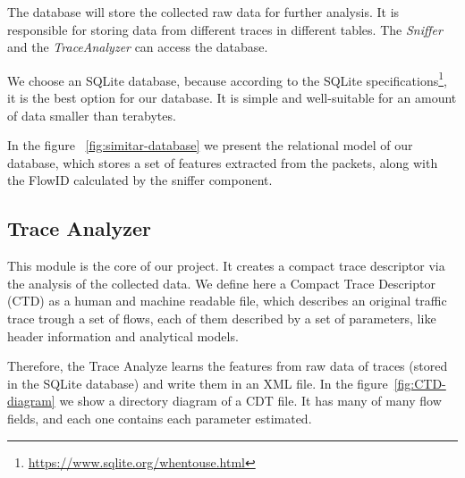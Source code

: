 The database will store the collected raw data for further analysis. It is responsible for storing data from different traces in different tables.  The \textit{Sniffer} and the \textit{TraceAnalyzer}  can access the database. 

We choose an SQLite database, because according to the SQLite specifications\footnote{\href{https://www.sqlite.org/whentouse.html}{https://www.sqlite.org/whentouse.html}}, it is the best option for our database. It is simple and well-suitable for an amount of data smaller than terabytes.

In the figure ~\ref{fig:simitar-database} we present the relational model of our database, which stores a set of features extracted from the packets, along with the FlowID calculated by the sniffer component. 


\subsection{Trace Analyzer}

This module is the core of our project. It creates a compact trace descriptor via the analysis of the collected data. We define here a Compact Trace Descriptor (CTD) as a human and machine readable file, which describes an original traffic trace trough a set of flows, each of them described by a set of parameters, like header information and analytical models. 

Therefore, the Trace Analyze learns the features from raw data of traces (stored in the SQLite database) and write them in an XML file.  In the figure~\ref{fig:CTD-diagram} we show a directory diagram of a CDT file. It has many of many flow fields, and each one contains each parameter estimated. 

%

